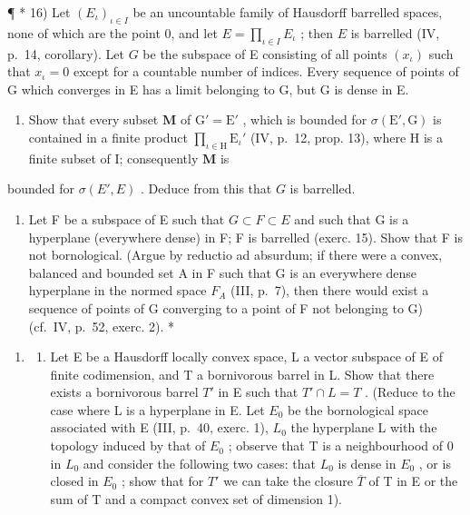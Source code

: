 ¶ * 16) Let \((E_{\iota})_{\iota\in I}\) be an uncountable family of Hausdorff barrelled spaces, none of which are the point 0, and let \(E = \prod_{\iota \in I} E_{\iota}\) ; then \(E\) is barrelled (IV, p.~14, corollary). Let \(G\) be the subspace of E consisting of all points \((x_{\iota})\) such that \(x_{\iota}=0\) except for a countable number of indices. Every sequence of points of G which converges in E has a limit belonging to G, but G is dense in E.

\begin{enumerate}
\def\labelenumi{\alph{enumi})}
\tightlist
\item
  Show that every subset \(\mathbf{M}\) of \(\mathrm{G}' = \mathrm{E}'\) , which is bounded for \(\sigma(\mathrm{E}', \mathrm{G})\) is contained in a finite product \(\prod_{\iota \in \mathrm{H}} \mathrm{E}_{\iota}'\) (IV, p.~12, prop. 13), where \(\mathrm{H}\) is a finite subset of I; consequently \(\mathbf{M}\) is
\end{enumerate}

bounded for \(\sigma(E', E)\) . Deduce from this that \(G\) is barrelled.

\begin{enumerate}
\def\labelenumi{\alph{enumi})}
\setcounter{enumi}{1}
\tightlist
\item
  Let F be a subspace of E such that \(G \subset F \subset E\) and such that G is a hyperplane (everywhere dense) in F; F is barrelled (exerc. 15). Show that F is not bornological. (Argue by reductio ad absurdum; if there were a convex, balanced and bounded set A in F such that G is an everywhere dense hyperplane in the normed space \(F_{A}\) (III, p.~7), then there would exist a sequence of points of G converging to a point of F not belonging to G) (cf.~IV, p.~52, exerc. 2). *
\end{enumerate}

\begin{enumerate}
\def\labelenumi{\arabic{enumi})}
\setcounter{enumi}{16}
\tightlist
\item
  \begin{enumerate}
  \def\labelenumii{\alph{enumii})}
  \tightlist
  \item
    Let E be a Hausdorff locally convex space, L a vector subspace of E of finite codimension, and T a bornivorous barrel in L. Show that there exists a bornivorous barrel \(T'\) in E such that \(T' \cap L = T\) . (Reduce to the case where L is a hyperplane in E. Let \(E_{0}\) be the bornological space associated with E (III, p.~40, exerc. 1), \(L_{0}\) the hyperplane L with the topology induced by that of \(E_{0}\) ; observe that T is a neighbourhood of 0 in \(L_{0}\) and consider the following two cases: that \(L_{0}\) is dense in \(E_{0}\) , or is closed in \(E_{0}\) ; show that for \(T'\) we can take the closure \(\overline{T}\) of T in E or the sum of T and a compact convex set of dimension 1).
  \end{enumerate}
\end{enumerate}

